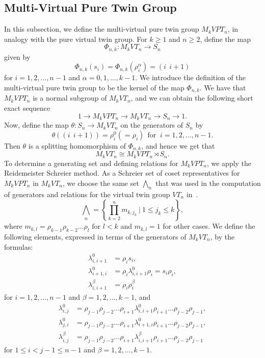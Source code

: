 \documentclass[preprint]{elsarticle}
\begin{document}
\subsection{Multi-Virtual Pure Twin Group}
In this subsection, we define the multi-virtual pure twin group $M_kVPT_n$, in analogy with the pure virtual twin group. For $k \geq 1$ and $n \geq 2$, define the map $$\Phi_{n,k}: M_kVT_n \longrightarrow S_n $$ given by $$ \Phi_{n,k}(s_i)=\Phi_{n,k}(\rho_i^{\alpha})=(i\ \ i+1)$$ for $i=1,2,\dots,n-1$ and $\alpha = 0,1,\dots,k-1.$ We introduce the definition of the multi-virtual pure twin group to be the kernel of the map $\Phi_{n,k}$. We have that $M_kVPT_n$ is a normal subgroup of $M_kVT_n$, and we can obtain the following short exact sequence
\[
1 \longrightarrow M_kVPT_n \longrightarrow M_kVT_n \longrightarrow S_n \longrightarrow 1.
\] Now, define the map $\theta:S_n \longrightarrow M_kVT_n$ on the generators of $S_n$ by \[ \theta((i \ \ i+1)) = \rho_i^{0}(=\rho_i) \ \ \text{for } \  i=1,2,\dots, n-1. \] Then $\theta$ is a splitting homomorphism of  $\Phi_{n,k}$, and hence we get that $$M_kVT_n \cong M_kVPT_n \rtimes S_n.$$
To determine a generating set and defining relations for $M_kVPT_n$, we apply the Reidemeister Schreier method. As a Schreier set of coset representatives for $M_kVPT_n$ in $M_kVT_n$, we choose the same set $\bigwedge_n$ that was used in the computation of generators and relations for the virtual twin group $VT_n$ in~\cite{TNM}. 
\[ \bigwedge_n =\left\{ \prod_{k=2}^{n} m_{k,j_k}\  |\  1\leq j_k \leq k \right\}, \] where $m_{k,l} = \rho_{k-1}\rho_{k-2}\dots \rho_l \text{ for } l < k $ and $m_{k,l}=1$ for other cases.
We define the following elements, expressed in terms of the generators of $M_kVT_n$, by the formulas:
\begin{align*}
    \lambda_{i,i+1}^0 &= \rho_is_i,\\
    \lambda_{i+1,i}^0 &=\rho_i \lambda_{i,i+1}^0 \rho_i = s_i\rho_i,\\
    \lambda_{i,i+1}^{\beta} &= \rho_i\rho_i^{\beta}
\end{align*}
for $i=1,2,\dots,n-1$ and $\beta=1,2,\ldots, k-1$, and 
\begin{align*}
    \lambda_{i,j}^0 &= \rho_{j-1} \rho_{j-2} \dots \rho_{i+1} \lambda_{i,i+1}^0 \rho_{i+1}\dots \rho_{j-2} \rho_{j-1},\\
     \lambda_{j,i}^0 &= \rho_{j-1} \rho_{j-2} \dots \rho_{i+1} \lambda_{i+1,i}^0 \rho_{i+1}\dots \rho_{j-2} \rho_{j-1},\\
      \lambda_{i,j}^{\beta} &= \rho_{j-1} \rho_{j-2} \dots \rho_{i+1} \lambda_{i,i+1}^{\beta} \rho_{i+1}\dots \rho_{j-2} \rho_{j-1}
\end{align*} 
for $1\leq i<j-1 \leq n-1$ and $\beta=1,2,\ldots, k-1.$
\end{document}
